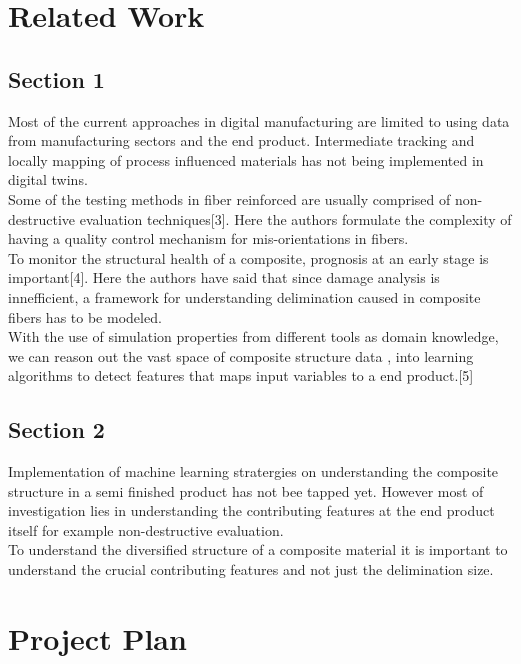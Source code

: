 \documentclass[rnd]{mas_proposal}
\begin{document}
\chapter{Related Work}
\section{Section 1}
Most of the current approaches in digital manufacturing are limited to using data from manufacturing sectors and the end product. Intermediate tracking and locally mapping of process influenced materials has not being implemented in digital twins.  \\
\indent Some of the testing methods in fiber reinforced are usually comprised of non-destructive evaluation techniques[3]. Here the authors formulate the complexity of having a quality control mechanism for mis-orientations in fibers.\\
\indent To monitor the structural health of a composite, prognosis at an early stage is important[4]. Here the authors have said that since damage analysis is innefficient, a framework for understanding delimination caused in composite fibers has to be modeled.\\
\indent With the use of simulation properties from different tools as domain knowledge, we can reason out the vast space of composite structure data , into learning algorithms to detect features that maps input variables to a end product.[5]

\section{Section 2}
Implementation of machine learning stratergies on understanding the composite structure in a semi finished product has not bee tapped yet. However most of investigation lies in understanding the contributing features at the end product itself for example non-destructive evaluation.\\
\indent To understand the diversified structure of a composite material it is important to understand the crucial contributing features and not just the delimination size. 



\chapter{Project Plan}
\end{document}

